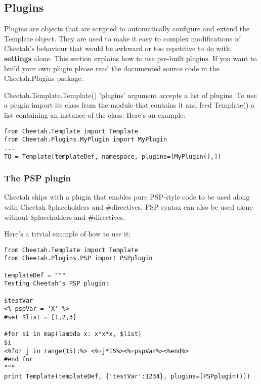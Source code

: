 \subsection{Plugins}

Plugins are objects that are scripted to automatically configure and extend the
Template object.  They are used to make it easy to complex modifications of
Cheetah's behaviour that would be awkward or too repetitive to do with {\bf
  settings} alone. This section explains how to use pre-built plugins. If you
want to build your own plugin please read the documented source code in the
Cheetah.Plugins package.

Cheetah.Template.Template() 'plugins' argument accepts a list of plugins. To use
a plugin import its class from the module that contains it and feed Template()
a list containing an instance of the class. Here's an example:

\begin{verbatim}
from Cheetah.Template import Template
from Cheetah.Plugins.MyPlugin import MyPlugin
...
TO = Template(templateDef, namespace, plugins=[MyPlugin(),])
\end{verbatim}


\subsubsection{The PSP plugin}
Cheetah ships with a plugin that enables pure PSP-style code to be used along
with Cheetah \$placeholders and \#directives.  PSP syntax can also be used
alone without \$placeholders and \#directives.

Here's a trivial example of how to use it:
\begin{verbatim}
from Cheetah.Template import Template
from Cheetah.Plugins.PSP import PSPplugin

templateDef = """
Testing Cheetah's PSP plugin:
 
$testVar
<% pspVar = 'X' %>
#set $list = [1,2,3]
 
#for $i in map(lambda x: x*x*x, $list)
$i
<%for j in range(15):%> <%=j*15%><%=pspVar%><%end%>
#end for
"""
print Template(templateDef, {'testVar':1234}, plugins=[PSPplugin()])

\end{verbatim}

